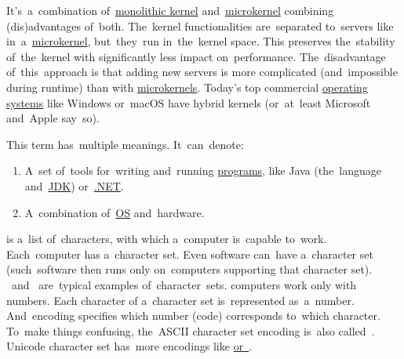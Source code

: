 \label{hybridkernel}
It's~a~combination of~\hyperref[monolithickernel]{monolithic kernel} and~\hyperref[microkernel]{microkernel} combining (dis)advantages of~both.
The~kernel functionalities are~separated to~servers like in~a~\hyperref[microkernel]{microkernel}, but~they~run in~the~kernel space.
This preserves the~stability of~the~kernel with significantly less impact on~performance.
The~disadvantage of~this~approach is that adding new servers is more complicated (and~impossible during runtime) than with \hyperref[microkernel]{microkernels}.
Today's top commercial \hyperref[os]{operating systems} like Windows or~macOS have hybrid kernels (or~at~least Microsoft and~Apple say~so).

\label{platform}
This term has~multiple meanings.
It~can~denote:
\begin{enumerate}[label=\arabic*)]
    \item A~set of~tools for~writing and~running \hyperref[applicationprocessprogramservicethread]{programs}, like Java (the~language and~\hyperref[jdkjrejvm]{JDK}) or~\hyperref[dotnet]{.NET}.
    \item A~combination of~\hyperref[os]{OS} and~hardware.
\end{enumerate}

\label{charactersetencoding}
\begin{itemize}
     is a~list of~characters, with which a~computer is~capable to~work.
            Each~computer has a~character set.
            Even software can~have a~character set (such~software then runs only on~computers supporting that character set).
            ~and~ are~typical examples of~character~sets.
     computers work only with numbers.
             Each character of a~character set is~represented as~a~number.
             And~encoding specifies which number (code) corresponds to~which character.
             To~make things confusing, the~ASCII character set encoding is~also called~.
             Unicode character set has~more encodings like \hyperref[utf]{ or~}.
\end{itemize}

